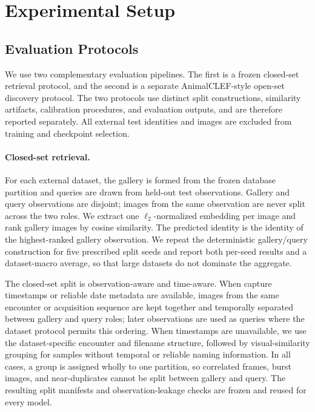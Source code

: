 \section{Experimental Setup}
\label{sec:experiments}

\subsection{Evaluation Protocols}
\label{sec:experiments:protocols}

We use two complementary evaluation pipelines. The first is a frozen
closed-set retrieval protocol, and the second is a separate AnimalCLEF-style
open-set discovery protocol. The two protocols use distinct split
constructions, similarity artifacts, calibration procedures, and evaluation
outputs, and are therefore reported separately. All external test identities
and images are excluded from training and checkpoint selection.

\paragraph{Closed-set retrieval.}
For each external dataset, the gallery is formed from the frozen database
partition and queries are drawn from held-out test observations. Gallery and
query observations are disjoint; images from the same observation are never
split across the two roles. We extract one $\ell_2$-normalized embedding per
image and rank gallery images by cosine similarity. The predicted identity is
the identity of the highest-ranked gallery observation. We repeat the
deterministic gallery/query construction for five prescribed split seeds and
report both per-seed results and a dataset-macro average, so that large
datasets do not dominate the aggregate.

The closed-set split is observation-aware and time-aware. When capture
timestamps or reliable date metadata are available, images from the same
encounter or acquisition sequence are kept together and temporally separated
between gallery and query roles; later observations are used as queries where
the dataset protocol permits this ordering. When timestamps are unavailable,
we use the dataset-specific encounter and filename structure, followed by
visual-similarity grouping for samples without temporal or reliable naming
information. In all cases, a group is assigned wholly to one partition, so
correlated frames, burst images, and near-duplicates cannot be split between
gallery and query. The resulting split manifests and observation-leakage checks are frozen and
reused for every model.

